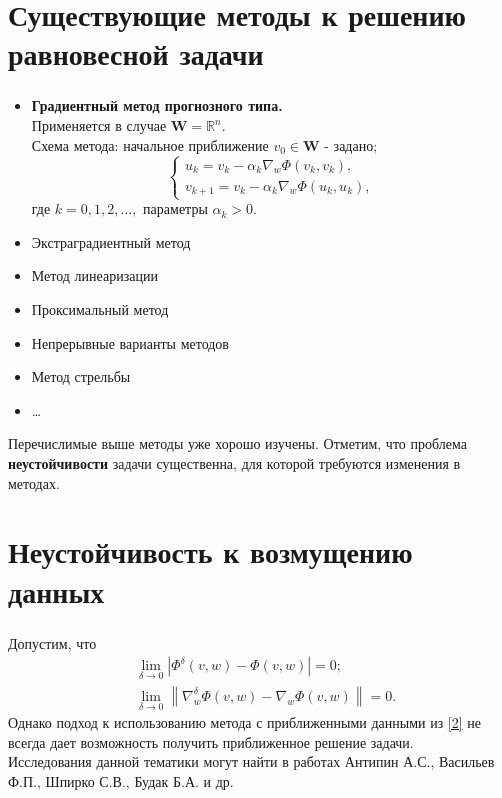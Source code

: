 \documentclass[unicode, t, 11pt]{beamer}%
\begin{document}
	\section{Существующие методы к решению равновесной задачи}
		\begin{frame}
			\frametitle{\insertsection}
					\begin{itemize}[label=\(\bullet\)]
						\item \textbf{Градиентный метод прогнозного типа.}\\
						Применяется в случае $\mathbf{W}=\mathbb{R}^n$.\\
						Схема метода: начальное приближение $v_0\in \mathbf{W}$ - задано;\\
						\begin{equation*}
						\left\{\begin{array}{l}
						u_k=v_k-\alpha_k \nabla_w\Phi(v_k,v_k),\\
						v_{k+1}=v_k-\alpha_k\nabla_w\Phi(u_k,u_k),
						\end{array}\right.
						\end{equation*}
						где $k=0,1,2,\ldots,$ параметры $\alpha_k>0$.
						\item Экстраградиентный метод
						\item Метод линеаризации
						\item Проксимальный метод
						\item Непрерывные варианты методов
						\item Метод стрельбы
						\item \ldots
					\end{itemize}
				Перечислимые выше методы уже хорошо изучены. Отметим, что проблема \textbf{неустойчивости} задачи существенна, для которой требуются изменения в методах.
	\end{frame}
			
	\section{Неустойчивость к возмущению данных}
	\begin{frame}
	\frametitle{\insertsection}
	Допустим, что 
	\begin{equation}
	\label{2}
	\begin{aligned}
	&\lim\limits_{\delta\to 0} \left|\Phi^{\delta}(v,w)-\Phi(v,w)\right|=0;\\
	&\lim\limits_{\delta\to 0} \left\|\nabla_w^{\delta}\Phi(v,w)-\nabla_w\Phi(v,w)\right\|=0.
	\end{aligned}
	\end{equation}
	Однако подход к использованию метода с приближенными данными из \eqref{2} не всегда дает возможность получить приближенное решение задачи. \\[15mm]
	
	Исследования данной тематики могут найти в работах Антипин А.С., Васильев Ф.П., Шпирко С.В., Будак Б.А. и др.
	
	\end{frame}
\end{document}

